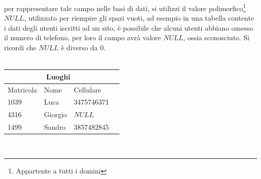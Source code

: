 \documentclass[12pt, letterpaper]{article}
\begin{document}
per rappresentare tale campo nelle basi di dati, si utilizzi il valore polimorfico\footnote{Appartente a tutti i domini} \(NULL\), utilizzato
per riempire gli spazi vuoti, ad esempio in una tabella contente i dati degli utenti iscritti ad un sito, è possibile che alcuni utenti abbiano
omesso il numero di telefono, per loro il campo avrà valore \(NULL\), ossia sconosciuto. Si ricordi che \(NULL\) è diverso da \(0\).
\\\centering
\hphantom{.}\\
\begin{tabular}{|l|l|l|r|}
    \hline
\multicolumn{3}{|c|}{\textbf{Luoghi}}\\
    \hline
    Matricola & Nome & Cellulare \\
    \hline
    1039 & Luca & 3475746371 \\
    \hline
    4316 & Giorgio & \(NULL\) \\
    \hline
    1499 & Sandro & 3857482845 \\
    \hline
    \end{tabular}\\
 \raggedright
\end{document}
